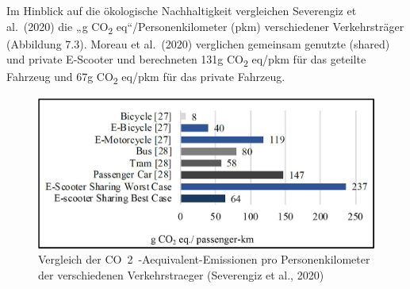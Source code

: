\documentclass[
]{book}
\begin{document}
Im Hinblick auf die ökologische Nachhaltigkeit vergleichen Severengiz et al.~(2020) die „g CO\textsubscript{2} eq``/Personenkilometer (pkm) verschiedener Verkehrsträger (Abbildung 7.3). Moreau et al.~(2020) verglichen gemeinsam genutzte (shared) und private E-Scooter und berechneten 131g CO\textsubscript{2} eq/pkm für das geteilte Fahrzeug und 67g CO\textsubscript{2} eq/pkm für das private Fahrzeug.

\begin{figure}
\includegraphics[width=0.5\linewidth]{image/flms_emissions} \caption{Vergleich der CO~2~-Aequivalent-Emissionen pro Personenkilometer der verschiedenen Verkehrstraeger (Severengiz et al., 2020)}\label{fig:unnamed-chunk-25}
\end{figure}
\end{document}
